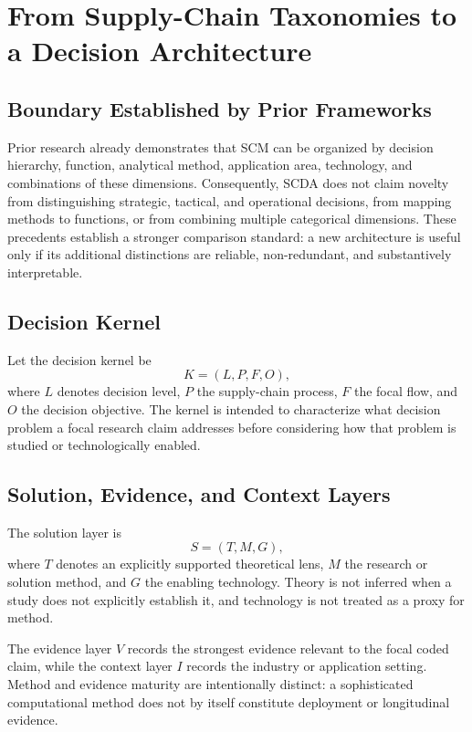 \documentclass[journal]{IEEEtran}
\begin{document}
\section{From Supply-Chain Taxonomies to a Decision Architecture}
\subsection{Boundary Established by Prior Frameworks}
Prior research already demonstrates that SCM can be organized by decision hierarchy, function, analytical method, application area, technology, and combinations of these dimensions. Consequently, SCDA does not claim novelty from distinguishing strategic, tactical, and operational decisions, from mapping methods to functions, or from combining multiple categorical dimensions. These precedents establish a stronger comparison standard: a new architecture is useful only if its additional distinctions are reliable, non-redundant, and substantively interpretable.

\subsection{Decision Kernel}
Let the decision kernel be
\begin{equation}
K=(L,P,F,O),
\end{equation}
where $L$ denotes decision level, $P$ the supply-chain process, $F$ the focal flow, and $O$ the decision objective. The kernel is intended to characterize what decision problem a focal research claim addresses before considering how that problem is studied or technologically enabled.

\subsection{Solution, Evidence, and Context Layers}
The solution layer is
\begin{equation}
S=(T,M,G),
\end{equation}
where $T$ denotes an explicitly supported theoretical lens, $M$ the research or solution method, and $G$ the enabling technology. Theory is not inferred when a study does not explicitly establish it, and technology is not treated as a proxy for method.

The evidence layer $V$ records the strongest evidence relevant to the focal coded claim, while the context layer $I$ records the industry or application setting. Method and evidence maturity are intentionally distinct: a sophisticated computational method does not by itself constitute deployment or longitudinal evidence.
\end{document}
